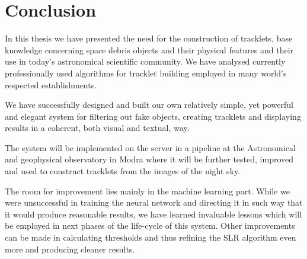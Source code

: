 \chapter{Conclusion}\label{chap:conclusion}

	In this thesis we have presented the need for the construction of tracklets, base knowledge concerning space debris objects and their physical features and their use in today's astronomical scientific community. We have analysed currently professionally used algorithms for tracklet building employed in many world's respected establishments. 	
	
	We have successfully designed and built our own relatively simple, yet powerful and elegant system for filtering out fake objects, creating tracklets and displaying results in a coherent, both visual and textual, way.
	
	The system will be implemented on the server in a pipeline at the Astronomical and geophysical observatory in Modra where it will be further tested, improved and used to construct tracklets from the images of the night sky.
	
	The room for improvement lies mainly in the machine learning part. While we were unsuccessful in training the neural network and directing it in such way that it would produce reasonable results, we have learned invaluable lessons which will be employed in next phases of the life-cycle of this system. Other improvements can be made in calculating thresholds and thus refining the SLR algorithm even more and producing cleaner results.